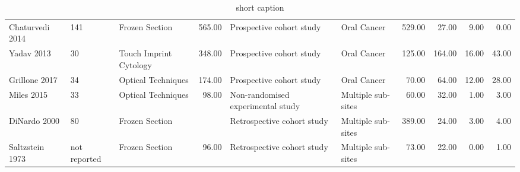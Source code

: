 \begin{table}[ht]
\begin{tabular}{lllrllrrrr}
  Chaturvedi 2014 & 141 & Frozen Section & 565.00 & Prospective cohort study & Oral Cancer & 529.00 & 27.00 & 9.00 & 0.00 \\ 
  Yadav 2013 & 30 & Touch Imprint Cytology & 348.00 & Prospective cohort study & Oral Cancer & 125.00 & 164.00 & 16.00 & 43.00 \\ 
  Grillone 2017 & 34 & Optical Techniques & 174.00 & Prospective cohort study & Oral Cancer & 70.00 & 64.00 & 12.00 & 28.00 \\ 
  Miles 2015 & 33 & Optical Techniques & 98.00 & Non-randomised experimental study & Multiple sub-sites & 60.00 & 32.00 & 1.00 & 3.00 \\ 
  DiNardo 2000 & 80 & Frozen Section &  & Retrospective cohort study & Multiple sub-sites & 389.00 & 24.00 & 3.00 & 4.00 \\ 
  Saltzstein 1973 & not reported & Frozen Section & 96.00 & Retrospective cohort study & Multiple sub-sites & 73.00 & 22.00 & 0.00 & 1.00 \\ 
   \hline
\end{tabular}
\endgroup
\caption[full caption]{short caption} 
\label{tab:study_details}
\end{table}
